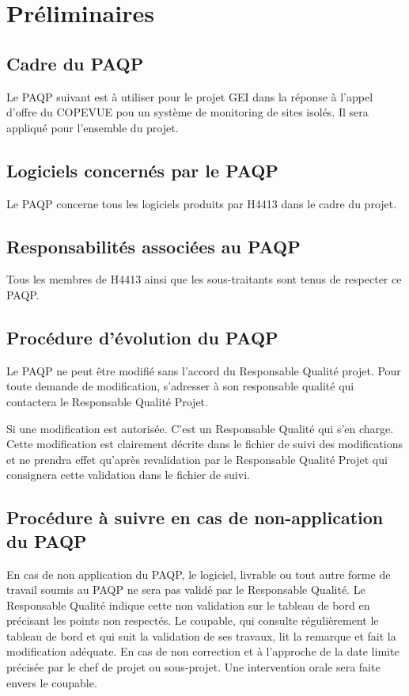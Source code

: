 
\section{Préliminaires}
    \subsection{Cadre du PAQP}
    Le PAQP suivant est à utiliser pour le projet GEI dans la réponse à l'appel 
d'offre du COPEVUE pou un système de monitoring de sites isolés.
Il sera appliqué pour l'ensemble du projet.
    \subsection{Logiciels concernés par le PAQP}
    Le PAQP concerne tous les logiciels produits par H4413 dans le cadre du
projet.
    \subsection{Responsabilités associées au PAQP}
    Tous les membres de H4413 ainsi que les sous-traitants sont tenus de
respecter ce PAQP.
    \subsection{Procédure d'évolution du PAQP}
    Le PAQP ne peut être modifié sans l'accord du Responsable Qualité projet.
    Pour toute demande de modification, s'adresser à son responsable qualité qui 
contactera le Responsable Qualité Projet.
    
    Si une modification est autorisée. C'est un Responsable Qualité qui s'en charge.
    Cette modification est clairement décrite dans le fichier de suivi des 
modifications et ne prendra effet qu'après revalidation par le Responsable 
Qualité Projet qui consignera cette validation dans le fichier de suivi.
    \subsection{Procédure à  suivre en cas de non-application du PAQP}
    En cas de non application du PAQP, le logiciel, livrable ou tout autre forme 
de travail soumis au PAQP ne sera pas validé par le Responsable Qualité.
    Le Responsable Qualité indique cette non validation sur le tableau de bord 
en précisant les points non respectés.
    Le coupable, qui consulte régulièrement le tableau de bord et qui suit la 
validation de ses travaux, lit la remarque et fait la modification adéquate.
    En cas de non correction et à l'approche de la date limite précisée par le 
chef de projet ou sous-projet. Une intervention orale sera faite envers le 
coupable.
\pagebreak
